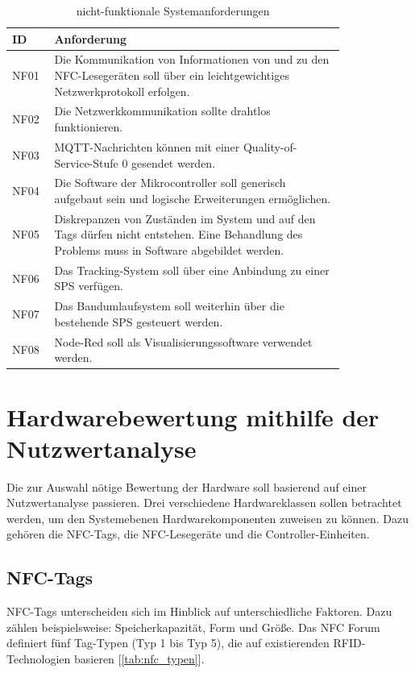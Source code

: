 \begin{table}[H]
	\centering
	\caption{nicht-funktionale Systemanforderungen}
	\label{tab:nf_anforderungen}
	\begin{tabular}{|p{0.075\linewidth}|p{0.75\linewidth}|}
		\hline
		\textbf{ID} & \textbf{Anforderung} \\ \hline

		NF01 & Die Kommunikation von Informationen von und zu den NFC-Lesegeräten soll über ein leichtgewichtiges Netzwerkprotokoll erfolgen. \\ \hline
		NF02 & Die Netzwerkkommunikation sollte drahtlos funktionieren. \\ \hline
		NF03 & MQTT-Nachrichten können mit einer Quality-of-Service-Stufe 0 gesendet werden. \\ \hline
		NF04 & Die Software der Mikrocontroller soll generisch aufgebaut sein und logische Erweiterungen ermöglichen. \\ \hline
		NF05 & Diskrepanzen von Zuständen im System und auf den Tags dürfen nicht entstehen. Eine Behandlung des Problems muss in Software abgebildet werden. \\ \hline
		NF06 & Das Tracking-System soll über eine Anbindung zu einer SPS verfügen. \\ \hline
		NF07 & Das Bandumlaufsystem soll weiterhin über die bestehende SPS gesteuert werden. \\ \hline
		NF08 & Node-Red soll als Visualisierungssoftware verwendet werden. \\ \hline
	\end{tabular}
\end{table}



\section{Hardwarebewertung mithilfe der Nutzwertanalyse}
\label{sec:hardwarebewertung}
Die zur Auswahl nötige Bewertung der Hardware soll basierend auf einer Nutzwertanalyse passieren. Drei verschiedene Hardwareklassen sollen betrachtet werden, um den Systemebenen Hardwarekomponenten zuweisen zu können. Dazu gehören die NFC-Tags, die NFC-Lesegeräte und die Controller-Einheiten. 

\subsection{NFC-Tags}
NFC-Tags unterscheiden sich im Hinblick auf unterschiedliche Faktoren. Dazu zählen beispielsweise: Speicherkapazität,  Form und Größe. Das NFC Forum definiert fünf Tag-Typen (Typ 1 bis Typ 5), die auf existierenden RFID-Technologien basieren [\autoref{tab:nfc_typen}]. 

